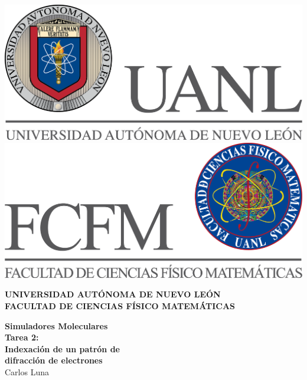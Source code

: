\documentclass[reprint,amsmath,amssymb,aps,]{revtex4-2}
\begin{document}
\begin{abstract}
\lipsum[1]
\end{abstract}
\begin{titlepage}
\begin{center}
\includegraphics[scale=0.40]{../../../Logos/uanl.png} 
\hspace{2.5cm}
\includegraphics[scale=0.40]{../../../Logos/fcfm.png}
\end{center}
\vspace{2cm}
\begin{center}
\textbf{
UNIVERSIDAD AUTÓNOMA DE NUEVO LEÓN\\
FACULTAD DE CIENCIAS
FÍSICO MATEMÁTICAS}\\
\vspace*{2cm}
\begin{large}
\vspace{1cm}
\large{\textbf{Simuladores Moleculares}}\vspace{1.5cm}\\
\textbf{Tarea 2:\\ Indexación de un patrón de \\difracción de electrones}\\
Carlos Luna\\
\end{large}
\vspace{3.5cm}

\end{center}
\end{titlepage}
\end{document}
